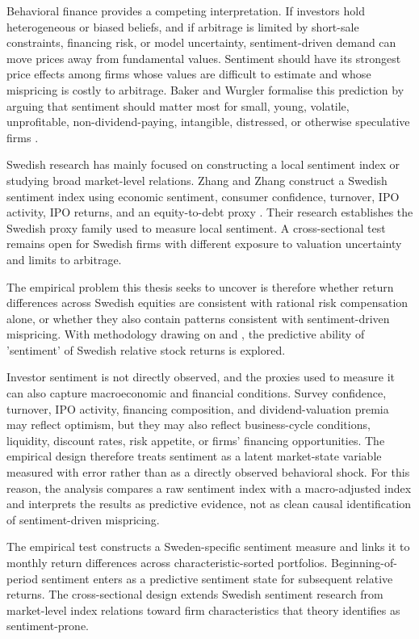 \documentclass[11pt]{article}
\begin{document}
Behavioral finance provides a competing interpretation. If investors hold heterogeneous or biased beliefs, and if arbitrage is limited by short-sale constraints, financing risk, or model uncertainty, sentiment-driven demand can move prices away from fundamental values. Sentiment should have its strongest price effects among firms whose values are difficult to estimate and whose mispricing is costly to arbitrage. Baker and Wurgler formalise this prediction by arguing that sentiment should matter most for small, young, volatile, unprofitable, non-dividend-paying, intangible, distressed, or otherwise speculative firms \citep{baker2006sentiment,baker2007}.

Swedish research has mainly focused on constructing a local sentiment index or studying broad market-level relations. Zhang and Zhang construct a Swedish sentiment index using economic sentiment, consumer confidence, turnover, IPO activity, IPO returns, and an equity-to-debt proxy \citep{zhang2023sweden}. Their research establishes the Swedish proxy family used to measure local sentiment. A cross-sectional test remains open for Swedish firms with different exposure to valuation uncertainty and limits to arbitrage. 

The empirical problem this thesis seeks to uncover is therefore whether return differences across Swedish equities are consistent with rational risk compensation alone, or whether they also contain patterns consistent with sentiment-driven mispricing. With methodology drawing on \citet{baker2006sentiment,baker2007} and \citet{stambaugh2012short}, the predictive ability of 'sentiment' of Swedish relative stock returns is explored.

Investor sentiment is not directly observed, and the proxies used to measure it can also capture macroeconomic and financial conditions. Survey confidence, turnover, IPO activity, financing composition, and dividend-valuation premia may reflect optimism, but they may also reflect business-cycle conditions, liquidity, discount rates, risk appetite, or firms' financing opportunities. The empirical design therefore treats sentiment as a latent market-state variable measured with error rather than as a directly observed behavioral shock. For this reason, the analysis compares a raw sentiment index with a macro-adjusted index and interprets the results as predictive evidence, not as clean causal identification of sentiment-driven mispricing.

The empirical test constructs a Sweden-specific sentiment measure and links it to monthly return differences across characteristic-sorted portfolios. Beginning-of-period sentiment enters as a predictive sentiment state for subsequent relative returns. The cross-sectional design extends Swedish sentiment research from market-level index relations toward firm characteristics that theory identifies as sentiment-prone.
\end{document}
